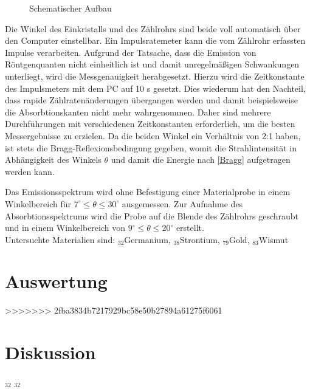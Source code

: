 \begin{figure}[H]
\centering
\caption{Schematischer Aufbau}
\label{Aufbau}
\end{figure}


Die Winkel des Einkristalls und des Zählrohrs sind beide voll automatisch über den Computer einstellbar. Ein Impulsratemeter
kann die vom Zählrohr erfassten Impulse verarbeiten. Aufgrund der Tatsache, dass die Emission von Röntgenquanten nicht
einheitlich ist und damit unregelmäßigen Schwankungen unterliegt, wird die Messgenauigkeit herabgesetzt. Hierzu wird die
Zeitkonstante des Impulsmeters mit dem PC auf 10 s gesetzt. Dies wiederum hat den Nachteil, dass rapide Zählratenänderungen
übergangen werden und damit beispielsweise die Absorbtionskanten nicht mehr wahrgenommen. Daher sind mehrere Durchführungen
mit verschiedenen Zeitkonstanten erforderlich, um die besten Messergebnisse zu erzielen. Da die beiden Winkel ein Verhältnis
von 2:1 haben, ist stets die Bragg-Reflexionsbedingung gegeben, womit die Strahlintensität in Abhängigkeit des Winkels
$\theta$ und damit die Energie nach \eqref{Bragg} aufgetragen werden kann. 

Das Emissionsspektrum wird ohne Befestigung einer Materialprobe in einem Winkelbereich für $7^\circ \le \theta \le 30^\circ$ ausgemessen.
Zur Aufnahme des Absorbtionsspektrums wird die Probe auf die Blende des Zählrohrs geschraubt und in einem Winkelbereich von
$9^\circ \le \theta \le 20^\circ$ erstellt.\\
Untersuchte Materialien sind: $_{32}$Germanium, $_{38}$Strontium, $_{79}$Gold, $_{83}$Wismut

\section{Auswertung}

>>>>>>> 2fba3834b7217929bc58e50b27894a61275f6061
\section{Diskussion}

$_{32}$
$_{32}$


